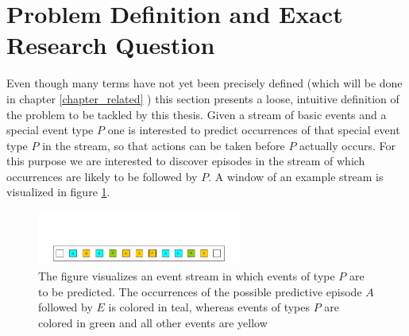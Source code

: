 \section{Problem Definition and Exact Research Question}
Even though many terms have not yet been precisely defined (which will be done in chapter \ref{chapter_related} ) this section presents a loose, intuitive definition of the problem to be tackled by this thesis. Given a stream of basic events and a special event type $P$ one is interested to predict occurrences of that special event type $P$ in the stream, so that actions can be taken before $P$ actually occurs. For this purpose we are interested to discover episodes in the stream of which occurrences are likely to be followed by $P$. A window of an example stream is visualized in figure \ref{fig_predictiveEpisodeExample}.

\begin{figure}[h]
	\centering
  	\includegraphics[width=0.6\textwidth]{examplePrediction.jpg}
	\caption{The figure visualizes an event stream in which events of type $P$ are to be predicted. The occurrences of the possible predictive episode $A$ followed by $E$ is colored in teal, whereas events of types $P$ are colored in green and all other events are yellow}
	\label{fig_predictiveEpisodeExample}
\end{figure}


